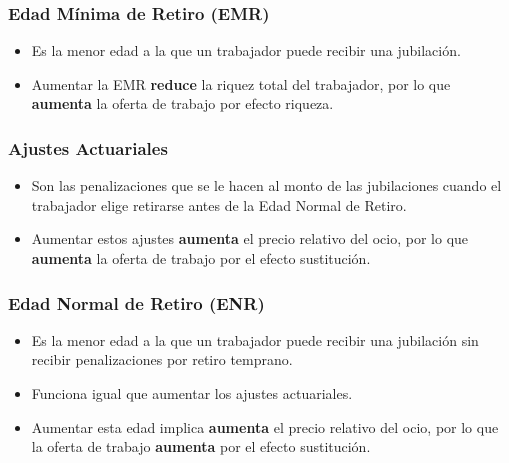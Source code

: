 \documentclass{beamer}
\begin{document}
\frame
{
  \frametitle{Edad Mínima de Retiro (EMR)}
    \begin{itemize}
      \item Es la menor edad a la que un trabajador puede recibir una jubilación.
      \item  Aumentar la EMR \textbf{reduce} la riquez total del trabajador, por lo que \textbf{aumenta} la oferta de trabajo por efecto riqueza.
      \
    \end{itemize}
}
        \frame
    {
      \frametitle{Ajustes Actuariales}
      \begin{itemize}
      \item Son las penalizaciones que se le hacen al monto de las jubilaciones cuando el trabajador elige retirarse antes de la Edad Normal de Retiro.
      \item Aumentar estos ajustes \textbf{aumenta} el precio relativo del ocio, por lo que \textbf{aumenta} la oferta de trabajo por el efecto sustitución.
    \end{itemize}
    }
    \frame
    {
      \frametitle{Edad Normal de Retiro (ENR)}
      \begin{itemize}
      \item Es la menor edad a la que un trabajador puede recibir una jubilación sin recibir penalizaciones por retiro temprano.
      \item Funciona igual que aumentar los ajustes actuariales.
      \item Aumentar esta edad implica \textbf{aumenta} el precio relativo del ocio, por lo que la oferta de trabajo \textbf{aumenta} por el efecto sustitución.
    \end{itemize}
    }
  
\end{document}
